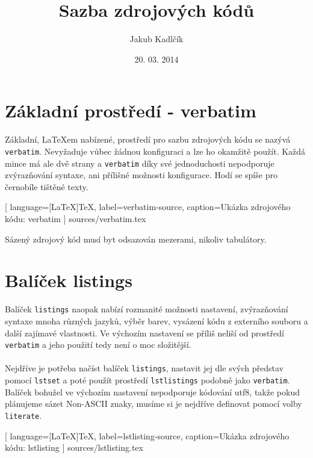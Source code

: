 \documentclass[10pt,a4paper]{article}
\title{Sazba zdrojových kódů}
\author{Jakub Kadlčík}
\date{20. 03. 2014}
\begin{document}
	\maketitle
	\newpage

	\tableofcontents
	\newpage

	\section{Základní prostředí - verbatim}

		Základní, LaTeXem nabízené, prostředí pro sazbu zdrojových kódu se nazývá \texttt{verbatim}. Nevyžaduje vůbec žádnou konfiguraci a lze ho okamžitě použít. Každá mince má ale dvě strany a \texttt{verbatim} díky své jednoduchosti nepodporuje zvýrazňování syntaxe, ani přílišné možnosti konfigurace. Hodí se spíše pro černobíle tištěné texty.

		\vspace{10pt}
		
		[
			language={[LaTeX]TeX},
			label=verbatim-source,
			caption={Ukázka zdrojového kódu: verbatim}
		] {sources/verbatim.tex}
		\vspace{10pt}

		
		\vspace{10pt}

		Sázený zdrojový kód musí byt odsazován mezerami, nikoliv tabulátory.

	\section{Balíček listings}

		Balíček \texttt{listings} naopak nabízí rozmanité možnosti nastavení, zvýrazňování syntaxe mnoha různých jazyků, výběr barev, vysázení kódu z externího souboru a další zajímavé vlastnosti. Ve výchozím nastavení se příliš neliší od prostředí \texttt{verbatim} a jeho použití tedy není o moc složitější.
		\\
		\\
		Nejdříve je potřeba načíst balíček \texttt{listings}, nastavit jej dle svých představ pomocí \texttt{lstset} a poté použít prostředí \texttt{lstlistings} podobně jako \texttt{verbatim}. Balíček bohužel ve výchozím nastavení nepodporuje kódování utf8, takže pokud plánujeme sázet Non-ASCII znaky, musíme si je nejdříve definovat pomocí volby \texttt{literate}.

		
		[
			language={[LaTeX]TeX},
			label=lstlisting-source,
			caption={Ukázka zdrojového kódu: lstlisting}
		] {sources/lstlisting.tex}
		\vspace{10pt}
\end{document}
